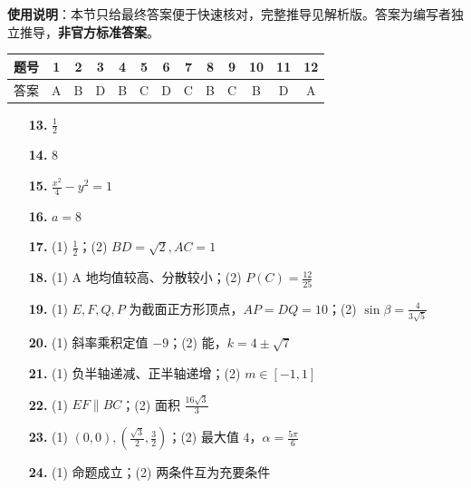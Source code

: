 
\begin{gknotice}
\textbf{使用说明}：本节只给最终答案便于快速核对，完整推导见解析版。答案为编写者独立推导，\textbf{非官方标准答案}。
\end{gknotice}

\begin{center}\begin{tabular}{ccccccccccccc}
\toprule
题号 & 1 & 2 & 3 & 4 & 5 & 6 & 7 & 8 & 9 & 10 & 11 & 12 \\
\midrule
答案 & A & B & D & B & C & D & C & B & C & B & D & A \\
\bottomrule
\end{tabular}\end{center}

\begin{itemize}[leftmargin=2.6em]
  \item[\textbf{13.}] $\frac12$
  \item[\textbf{14.}] $8$
  \item[\textbf{15.}] $\frac{x^2}{4}-y^2=1$
  \item[\textbf{16.}] $a=8$
\end{itemize}

\begin{itemize}[leftmargin=2.6em]
  \item[\textbf{17.}] (1) $\frac12$；(2) $BD=\sqrt2, AC=1$
  \item[\textbf{18.}] (1) A 地均值较高、分散较小；(2) $P(C)=\frac{12}{25}$
  \item[\textbf{19.}] (1) $E,F,Q,P$ 为截面正方形顶点，$AP=DQ=10$；(2) $\sin\beta=\frac4{3\sqrt5}$
  \item[\textbf{20.}] (1) 斜率乘积定值 $-9$；(2) 能，$k=4\pm\sqrt7$
  \item[\textbf{21.}] (1) 负半轴递减、正半轴递增；(2) $m\in[-1,1]$
  \item[\textbf{22.}] (1) $EF\parallel BC$；(2) 面积 $\frac{16\sqrt3}{3}$
  \item[\textbf{23.}] (1) $(0,0),(\frac{\sqrt3}{2},\frac32)$；(2) 最大值 $4$，$\alpha=\frac{5\pi}{6}$
  \item[\textbf{24.}] (1) 命题成立；(2) 两条件互为充要条件
\end{itemize}
